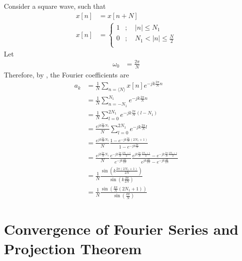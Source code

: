 \documentclass[titlepage, fleqn, a4paper, 12pt, twoside]{article}
\theoremstyle{definition}
\theoremstyle{theorem}
\begin{document}
Consider a square wave, such that
\begin{align*}
	x[n] &= x[n + N]\\
	x[n] &=
		\begin{cases}
			1 &;\quad |n| \le N_1\\
			0 &;\quad N_1 < |n| \le \frac{N}{2}\\
		\end{cases}
\end{align*}
Let
\begin{align*}
	\omega_0 &= \frac{2 \pi}{N}
\end{align*}
Therefore, by , the Fourier coefficients are
\begin{align*}
	a_k &= \frac{1}{N} \sum\limits_{n = \langle N \rangle} x[n] e^{-j k \frac{2 \pi}{N} n}\\
	&= \frac{1}{N} \sum\limits_{n = -N_1}^{N_1} e^{-j k \frac{2 \pi}{N} n}\\
	&= \frac{1}{N} \sum\limits_{l = 0}^{2 N_1} e^{-j k \frac{2 \pi}{N} (l - N_1)}\\
	&= \frac{e^{j k \frac{2 \pi}{N} N_1}}{N} \sum\limits_{l = 0}^{2 N_1} e^{-j k \frac{2 \pi}{N} l}\\
	&= \frac{e^{j k \frac{2 \pi}{N} N_1}}{N} \frac{1 - e^{-j k \frac{2 \pi}{N} (2 N_1 + 1)}}{1 - e^{-j k \frac{2 \pi}{N}}}\\
	&= \frac{e^{j k \frac{2 \pi}{N} N_1}}{N} \frac{e^{-j k \frac{2 \pi}{N} \frac{2 N_1 + 1}{2}}}{e^{-j k \frac{2 \pi}{2 N}}} \frac{e^{j k \frac{2 \pi}{N} \frac{2 N_1 + 1}{2}} - e^{-j k \frac{2 \pi}{N} \frac{2 N_1 + 1}{2}}}{e^{j k \frac{2 \pi}{2 N}} - e^{-j k \frac{2 \pi}{2 N}}}\\
	&= \frac{1}{N} \frac{\sin\left( k \frac{2 \pi (2 N_1 + 1)}{2 N} \right)}{\sin\left( k \frac{2 \pi}{2 N} \right)}\\
	&= \frac{1}{N} \frac{\sin\left( \frac{k \pi}{N} (2 N_1 + 1) \right)}{\sin\left( \frac{k \pi}{N} \right)}
\end{align*}

\section{Convergence of Fourier Series and Projection Theorem}
\end{document}
